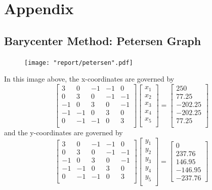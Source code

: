 \documentclass[11pt]{report}
\begin{document}
\section{Appendix}
\subsection{Barycenter Method: Petersen Graph}
\begin{figure}[H]
    \centering
    \texttt{[image: "report/petersen".pdf]}
\end{figure}

In this image above, the x-coordinates are governed by
\[
    \begin{bmatrix}
        3  & 0  & -1 & -1 &  0 \\
        0  & 3  &  0 & -1 & -1 \\
        -1 & 0  &  3 & 0 & -1 \\
        -1 & -1 &  0 & 3 & 0 \\
        0  & -1 & -1 & 0 & 3 \\
    \end{bmatrix}
    \begin{bmatrix}
        x_1 \\
        x_2 \\
        x_3 \\
        x_4 \\
        x_5 \\
    \end{bmatrix}  =
    \begin{bmatrix}
        250 \\
        77.25 \\
        -202.25 \\
        -202.25 \\ 
        77.25 \\
    \end{bmatrix}
\]
and the y-coordinates are governed by
\[
    \begin{bmatrix}
3  & 0  & -1 & -1 &  0 \\
0  & 3  &  0 & -1 & -1 \\
-1 & 0  &  3 & 0 & -1 \\
-1 & -1 &  0 & 3 & 0 \\
0  & -1 & -1 & 0 & 3 \\
\end{bmatrix}
\begin{bmatrix}
y_1 \\
y_2 \\
y_3 \\
y_4 \\
y_5 \\
\end{bmatrix}  =
    \begin{bmatrix}
0 \\
237.76 \\
146.95 \\
-146.95 \\
-237.76
\end{bmatrix}
\]
\end{document}
